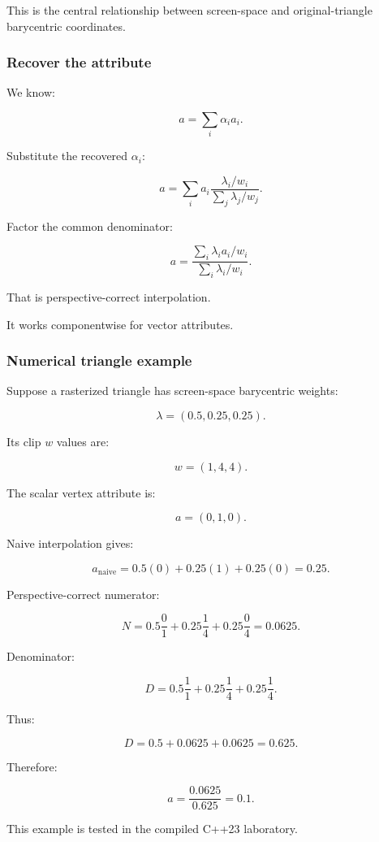 This is the central relationship between screen-space and original-triangle barycentric coordinates.

\subsubsection{Recover the attribute}\label{recover-the-attribute}

We know:

\[
 a=\sum_i\alpha_i a_i.
\]

Substitute the recovered \(\alpha_i\):

\[
 a= \sum_i a_i \frac{\lambda_i/w_i} {\sum_j\lambda_j/w_j}.
\]

Factor the common denominator:

\[
 \boxed{ a= \frac{ \sum_i\lambda_i a_i/w_i }{ \sum_i\lambda_i/w_i } }.
\]

That is perspective-correct interpolation.

It works componentwise for vector attributes.

\subsubsection{Numerical triangle example}\label{numerical-triangle-example}

Suppose a rasterized triangle has screen-space barycentric weights:

\[
 \lambda=(0.5,0.25,0.25).
\]

Its clip \(w\) values are:

\[
 w=(1,4,4).
\]

The scalar vertex attribute is:

\[
 a=(0,1,0).
\]

Naive interpolation gives:

\[
 a_{\mathrm{naive}} = 0.5(0)+0.25(1)+0.25(0) =\boxed{0.25}.
\]

Perspective-correct numerator:

\[
 N= 0.5\frac01+ 0.25\frac14+ 0.25\frac04 =0.0625.
\]

Denominator:

\[
 D= 0.5\frac11+ 0.25\frac14+ 0.25\frac14.
\]

Thus:

\[
 D=0.5+0.0625+0.0625=0.625.
\]

Therefore:

\[
 \boxed{ a=\frac{0.0625}{0.625}=0.1 }.
\]

This example is tested in the compiled C++23 laboratory.

